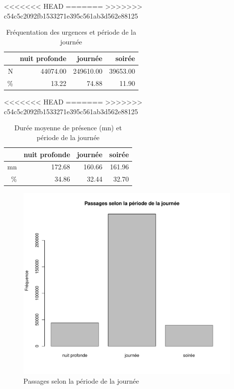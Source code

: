 \documentclass[12pt,english,french,twoside]{book}\usepackage[]{graphicx}\usepackage[]{color}
\makeatletter
\def\maxwidth{ %
  \ifdim\Gin@nat@width>\linewidth
    \linewidth
  \else
    \Gin@nat@width
  \fi
}
\newenvironment{knitrout}{}{} %
\makeatother
\begin{document}
<<<<<<< HEAD
=======
>>>>>>> c54c5c2092fb1533271e395c561ab3d562e88125
\begin{table}[ht]
\centering
\begin{tabular}{rrrr}
  \hline
 & nuit profonde & journée & soirée \\ 
  \hline
N & 44074.00 & 249610.00 & 39653.00 \\ 
  \% & 13.22 & 74.88 & 11.90 \\ 
   \hline
\end{tabular}
\caption[Fréquentation des SU et période]{Fréquentation des urgences et période de la journée} 
\label{tab:freq_periode}
\end{table}
<<<<<<< HEAD
=======
>>>>>>> c54c5c2092fb1533271e395c561ab3d562e88125
\begin{table}[ht]
\centering
\begin{tabular}{rrrr}
  \hline
 & nuit profonde & journée & soirée \\ 
  \hline
mn & 172.68 & 160.66 & 161.96 \\ 
  \% & 34.86 & 32.44 & 32.70 \\ 
   \hline
\end{tabular}
\caption[Durée de présence et période]{Durée  moyenne de présence (mn) et période de la journée} 
\label{duree_periode}
\end{table}



\begin{figure}[ht!]
 \centering
\begin{knitrout}
\color{fgcolor}
\includegraphics[width=\maxwidth]{figure/bp_periode} 

\end{knitrout}

 \caption{Passages selon la période de la journée}
 \label{fig:bp_periode}
\end{figure}
\end{document}
